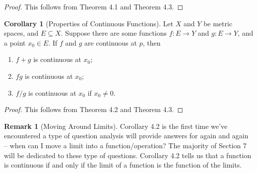 \documentclass{article}
\theoremstyle{definition}
\newtheorem{corollary}{Corollary}[section]
\newtheorem{remark}{Remark}[section]
\begin{document}
	\begin{proof}
		This follows from Theorem 4.1 and Theorem 4.3. 
	\end{proof}
	\begin{corollary}[Properties of Continuous Functions] 
		Let $ X $ and $ Y $ be metric spaces, and $ E\subseteq X $. Suppose there are some functions $ f:E\to Y $ and $ g:E\to Y $, and a point $ x_0 \in E $. If $ f $ and $ g $ are continuous at $ p $, then 
		\begin{enumerate}
			\item $ f+g $ is continuous at $ x_0 $;
			\item $ fg $ is continuous at $ x_0 $;
			\item $ f/g $ is continuous at $ x_0 $ if $ x_0\neq0 $.
		\end{enumerate}
	\end{corollary}
	\begin{proof}
		This follows from Theorem 4.2 and Theorem 4.3.
	\end{proof}
	\begin{remark}[Moving Around Limits]
		Corollary 4.2 is the first time we've encountered a type of question analysis will provide answers for again and again -- when can I move a limit into a function/operation? The majority of Section 7 will be dedicated to these type of questions. Corollary 4.2 tells us that a function is continuous if and only if the limit of a function is the function of the limits.   
	\end{remark}
\end{document}
